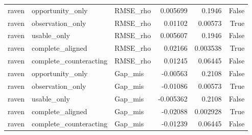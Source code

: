 \begin{table}
\begin{tabular}{lllrrr}
raven & opportunity_only & RMSE_rho & 0.005699 & 0.1946 & False \\
raven & observation_only & RMSE_rho & 0.01102 & 0.00573 & True \\
raven & usable_only & RMSE_rho & 0.005607 & 0.1946 & False \\
raven & complete_aligned & RMSE_rho & 0.02166 & 0.003538 & True \\
raven & complete_counteracting & RMSE_rho & 0.01245 & 0.06445 & False \\
raven & opportunity_only & Gap_mis & -0.00563 & 0.2108 & False \\
raven & observation_only & Gap_mis & -0.01086 & 0.00573 & True \\
raven & usable_only & Gap_mis & -0.005362 & 0.2108 & False \\
raven & complete_aligned & Gap_mis & -0.02088 & 0.002928 & True \\
raven & complete_counteracting & Gap_mis & -0.01239 & 0.06445 & False \\
\bottomrule
\end{tabular}
\end{table}
